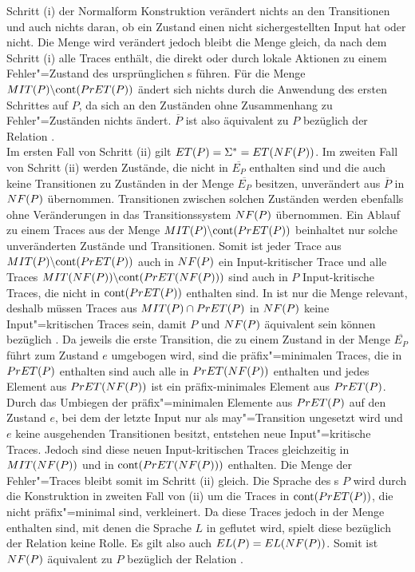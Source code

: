 Schritt (i) der Normalform Konstruktion verändert nichts an den Transitionen
und auch nichts daran, ob ein Zustand einen nicht sichergestellten Input hat
oder nicht. Die Menge \StET{} wird verändert jedoch bleibt die Menge \PrET{}
gleich, da \StET{} nach dem Schritt (i) alle Traces enthält, die direkt oder
durch lokale Aktionen zu einem Fehler"=Zustand des ursprünglichen \MEIO{}s
führen. Für die Menge $MIT (P)\backslash\mathrm{cont} (PrET (P))$ ändert sich nichts
durch die Anwendung des ersten Schrittes auf $P$, da sich an den Zuständen ohne
Zusammenhang zu Fehler"=Zuständen nichts ändert. $\overline{P}$ ist also
äquivalent zu $P$ bezüglich der Relation \ERel{}.\\
Im ersten Fall von Schritt (ii) gilt $ET (P) = \Sigma ^* = ET (NF (P))$. Im
zweiten Fall von Schritt (ii) werden Zustände, die nicht in $\overline{E_P}$
enthalten sind und die auch keine Transitionen zu Zuständen in der Menge
$\overline{E_P}$ besitzen, unverändert aus $\overline{P}$ in $NF (P)$
übernommen. Transitionen zwischen solchen Zuständen werden ebenfalls ohne
Veränderungen in das Transitionssystem $NF (P)$ übernommen. Ein Ablauf zu
einem Traces aus der Menge $MIT (P)\backslash\mathrm{cont} (PrET (P))$ beinhaltet nur
solche unveränderten Zustände und Transitionen. Somit ist jeder Trace aus $MIT
(P)\backslash\mathrm{cont} (PrET (P))$ auch in $NF (P)$ ein Input-kritischer Trace
und alle Traces $MIT (NF (P))\backslash\mathrm{cont} (PrET (NF (P)))$ sind auch in
$P$ Input-kritische Traces, die nicht in $\mathrm{cont} (PrET (P))$ enthalten sind. In
\ERel{} ist nur die Menge \ET{} relevant, deshalb müssen Traces aus $MIT
(P)\cap PrET (P)$ in $NF (P)$ keine Input"=kritischen Traces sein, damit $P$
und $NF (P)$ äquivalent sein können bezüglich \ERel{}. Da jeweils die erste
Transition, die zu einem Zustand in der Menge $\overline{E _P}$ führt zum
Zustand $e$ umgebogen wird, sind die präfix"=minimalen Traces, die in $PrET
(P)$ enthalten sind auch alle in $PrET (NF (P))$ enthalten und jedes Element
aus $PrET (NF (P))$ ist ein präfix-minimales Element aus $PrET (P)$. Durch
das Umbiegen der präfix"=minimalen Elemente aus $PrET (P)$ auf den Zustand
$e$, bei dem der letzte Input nur als may"=Transition ungesetzt wird und $e$
keine ausgehenden Transitionen besitzt, entstehen neue Input"=kritische Traces.
Jedoch sind diese neuen Input-kritischen Traces gleichzeitig in $MIT (NF
(P))$ und in $\mathrm{cont} (PrET (NF (P)))$ enthalten. Die Menge der Fehler"=Traces
\ET{} bleibt somit im Schritt (ii) gleich. Die Sprache des \MEIO{}s $P$ wird
durch die Konstruktion in zweiten Fall von (ii) um die Traces in $\mathrm{cont} (PrET
(P))$, die nicht präfix"=minimal sind, verkleinert. Da diese Traces jedoch in
der Menge \ET{} enthalten sind, mit denen die Sprache $L$ in \EL{} geflutet
wird, spielt diese bezüglich der Relation \ERel{} keine Rolle. Es gilt also
auch $EL (P) = EL (NF (P))$. Somit ist $NF (P)$ äquivalent zu $P$ bezüglich
der Relation \ERel{}.

